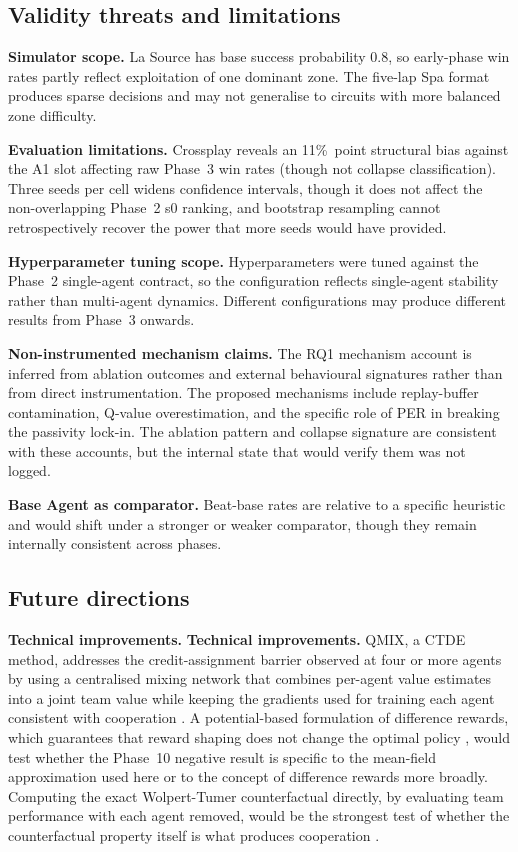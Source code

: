\subsection{Validity threats and limitations}
\label{sec:validity}

\textbf{Simulator scope.} La Source has base success probability 0.8, so early-phase win rates partly reflect exploitation of one dominant zone. The five-lap Spa format produces sparse decisions and may not generalise to circuits with more balanced zone difficulty.

\textbf{Evaluation limitations.} Crossplay reveals an 11\%\ point structural bias against the A1 slot affecting raw Phase~3 win rates (though not collapse classification). Three seeds per cell widens confidence intervals, though it does not affect the non-overlapping Phase~2 s0 ranking, and bootstrap resampling cannot retrospectively recover the power that more seeds would have provided.

\textbf{Hyperparameter tuning scope.} Hyperparameters were tuned against the Phase~2 single-agent contract, so the configuration reflects single-agent stability rather than multi-agent dynamics. Different configurations may produce different results from Phase~3 onwards.

\textbf{Non-instrumented mechanism claims.} The RQ1 mechanism account is inferred from ablation outcomes and external behavioural signatures rather than from direct instrumentation. The proposed mechanisms include replay-buffer contamination, Q-value overestimation, and the specific role of PER in breaking the passivity lock-in. The ablation pattern and collapse signature are consistent with these accounts, but the internal state that would verify them was not logged.

\textbf{Base Agent as comparator.} Beat-base rates are relative to a specific heuristic and would shift under a stronger or weaker comparator, though they remain internally consistent across phases.

\subsection{Future directions}
\label{sec:futurework}

\textbf{Technical improvements.} \textbf{Technical improvements.} QMIX, a CTDE method, addresses the credit-assignment barrier observed at four or more agents by using a centralised mixing network that combines per-agent value estimates into a joint team value while keeping the gradients used for training each agent consistent with cooperation \citep{rashid2018qmix, amato2024ctde_intro}. A potential-based formulation of difference rewards, which guarantees that reward shaping does not change the optimal policy \citep{devlin2014potential}, would test whether the Phase~10 negative result is specific to the mean-field approximation used here or to the concept of difference rewards more broadly. Computing the exact Wolpert-Tumer counterfactual directly, by evaluating team performance with each agent removed, would be the strongest test of whether the counterfactual property itself is what produces cooperation \citep{wolpert2001optimal}.

